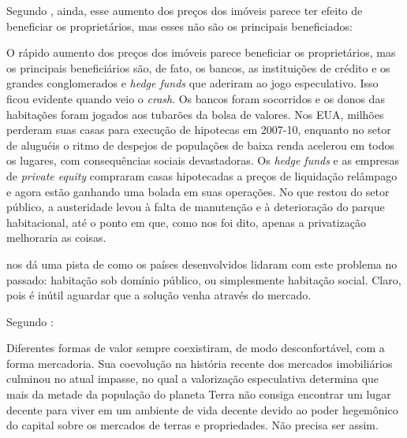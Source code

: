 \documentclass[
	12pt,				%
	oneside,			%
	a4paper,			%
	chapter=TITLE,		%
	section=TITLE,		%
	english,			%
	brazil				%
	]{abntex2}
\begin{document}
\begin{refsection}
Segundo \textcite{terraredonda}, ainda, esse aumento dos preços dos imóveis parece ter
efeito de beneficiar os proprietários, mas esses não são os principais
beneficiados:
\begin{citacao}
O rápido aumento dos preços dos imóveis parece beneficiar os proprietários, mas
os principais beneficiários são, de fato, os bancos, as instituições de crédito
e os grandes conglomerados e \emph{hedge funds} que aderiram ao jogo
especulativo.
Isso ficou evidente quando veio o \emph{crash}. Os bancos foram socorridos e os
donos das habitações foram jogados aos tubarões da bolsa de valores. Nos \gls{EUA},
milhões perderam suas casas para execução de hipotecas em 2007-10, enquanto no
setor de aluguéis o ritmo de despejos de populações de baixa renda acelerou em
todos os lugares, com consequências sociais devastadoras. Os \emph{hedge funds}
e as empresas de \emph{private equity} compraram casas hipotecadas a preços de
liquidação relâmpago e agora estão ganhando uma bolada em suas operações. No que
restou do setor público, a austeridade levou à falta de manutenção e à
deterioração do parque habitacional, até o ponto em que, como nos foi dito,
apenas a privatização melhoraria as coisas.
\end{citacao}
\textcite{terraredonda} nos dá uma pista de como os países desenvolvidos lidaram com este
problema no passado: habitação sob domínio público, ou simplesmente habitação
social. Claro, pois é inútil aguardar que a solução venha através do mercado.

Segundo \textcite{terraredonda}:
\begin{citacao}
Diferentes formas de valor sempre coexistiram, de modo desconfortável, com a
forma mercadoria. Sua coevolução na história recente dos mercados imobiliários
culminou no atual impasse, no qual a valorização especulativa determina que mais
da metade da população do planeta Terra não consiga encontrar um lugar decente
para viver em um ambiente de vida decente devido ao poder hegemônico do capital
sobre os mercados de terras e propriedades. Não precisa ser assim.


\end{citacao}
\end{refsection}
\end{document}
